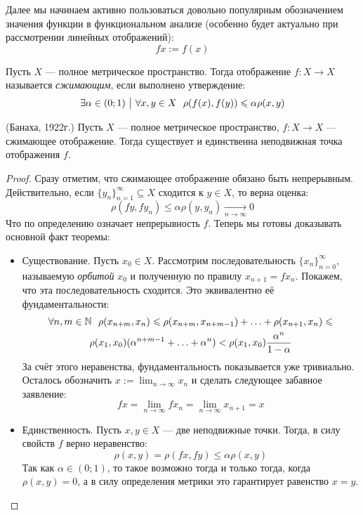 \begin{designation}
	Далее мы начинаем активно пользоваться довольно популярным обозначением значения функции в функциональном анализе (особенно будет актуально при рассмотрении линейных отображений):
	\[
		fx := f(x)
	\]
\end{designation}

\begin{definition}
	Пусть $X$ --- полное метрическое пространство. Тогда отображение $f \colon X \to X$ называется \textit{сжимающим}, если выполнено утверждение:
	\[
		\exists \alpha \in (0; 1) \ \big|\  \forall x, y \in X\ \ \rho(f(x), f(y)) \leqslant \alpha\rho(x, y)
	\]
\end{definition}

\begin{theorem} (Банаха, 1922г.)
	Пусть $X$ --- полное метрическое пространство, $f \colon X \to X$ --- сжимающее отображение. Тогда существует и единственна неподвижная точка отображения $f$.
\end{theorem}

\begin{proof}
	Сразу отметим, что сжимающее отображение обязано быть непрерывным. Действительно, если $\{y_n\}_{n = 1}^\infty \subseteq X$ сходится к $y \in X$, то верна оценка:
	\[
		\rho(fy, fy_n) \le \alpha\rho(y, y_n) \xrightarrow[n \to \infty]{} 0
	\]
	Что по определению означает непрерывность $f$. Теперь мы готовы доказывать основной факт теоремы:
	\begin{itemize}
		\item Существование. Пусть $x_0 \in X$. Рассмотрим последовательность $\{x_n\}_{n = 0}^\infty$, называемую \textit{орбитой} $x_0$ и полученную по правилу $x_{n + 1} = fx_n$. Покажем, что эта последовательность сходится. Это эквивалентно её фундаментальности:
		\begin{multline*}
			\forall n, m \in \mathbb{N}\ \ \rho(x_{n + m}, x_n) \leqslant \rho(x_{n + m}, x_{n + m - 1}) + \ldots + \rho(x_{n + 1}, x_n) \leqslant
			\\
			\rho(x_1, x_0)(\alpha^{n + m - 1} + \ldots + \alpha^n) < \rho(x_1, x_0) \frac{\alpha^n}{1 - \alpha}
		\end{multline*}
		За счёт этого неравенства, фундаментальность показывается уже тривиально. Осталось обозначить $x := \lim_{n \to \infty} x_n$ и сделать следующее забавное заявление:
		\[
			fx = \lim_{n \to \infty} fx_n = \lim_{n \to \infty} x_{n + 1} = x
		\]
		
		\item Единственность. Пусть $x, y \in X$ --- две неподвижные точки. Тогда, в силу свойств $f$ верно неравенство:
		\[
			\rho(x, y) = \rho(fx, fy) \le \alpha\rho(x, y)
		\]
		Так как $\alpha \in (0; 1)$, то такое возможно тогда и только тогда, когда $\rho(x, y) = 0$, а в силу определения метрики это гарантирует равенство $x = y$.
	\end{itemize}
\end{proof}

